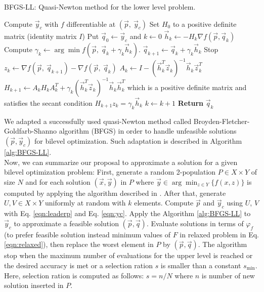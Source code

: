 \documentclass[conference]{IEEEtran}
\theoremstyle{definition}
\begin{document}
\begin{algorithm}[!ht]
    \caption{BFGS-LL: Quasi-Newton method for the lower level problem.}
    \label{alg:BFGS-LL}
    \begin{algorithmic}[1]
        \STATE Compute $\vec{y}_c$ with $f$ differentiable at $(\vec{p},\ \vec{y}_c)$
        \STATE Set $H_0$ to a positive definite matrix (identity matrix $I$)
        \STATE Put $\vec{q}_0 \gets \vec{y}_c$ and $k \gets 0$
            \STATE $\vec{h}_k \gets -H_k\nabla f(\vec{p}, \vec{q}_k)$
            \STATE Compute $\gamma_{k}\gets\arg \min f(\vec{p}, \ \vec{q} _{k}+ \gamma_k \vec{h} _{k})$.
            \STATE $\vec{q}_{k+1} \gets \vec{q}_k  + \gamma_k \vec{h}_k$
                \STATE Stop
            \ENDIF
            \STATE $z_k \gets \nabla f(\vec{p}, \ \vec{q}_{k+1}) - \nabla f(\vec{p}, \ \vec{q}_{k}) $
            \STATE $\displaystyle A_k \gets I - (\vec{h}_k^T \vec{z}_k)^{-1} \vec{h}_k \vec{z}_k^T$
            \STATE $H_{k+1} \gets A_k H_k A_k^T + \gamma_k(\vec{h}_k^T\vec{z}_k)^{-1}\vec{h}_k \vec{h}_k^T$
                   which is a positive definite matrix and satisfies the secant
                   condition $H_{k+1} z_k = \gamma_k \vec{h}_k$
            \STATE $k \gets k + 1$
        \ENDWHILE
        \STATE \textbf{Return} $\vec{q}_k$
    \end{algorithmic}
\end{algorithm}

We adapted a successfully used quasi-Newton method called Broyden-Fletcher-Goldfarb-Shanno
algorithm (BFGS) \cite{fletcher2013practical} in order to handle unfeasible
solutions $(\vec{p}, \vec{y}_c)$ for bilevel optimization. Such adaptation is
described in Algorithm \ref{alg:BFGS-LL}. \\
% 


Now, we can summarize our proposal to approximate a solution for a given bilevel
optimization problem: First, generate a random 2-population $P \in X \times Y$ of
size $N$ and for each solution $(\vec{x}, \vec{y})$ in $P$ where $\vec{y} \in \arg \min_{z\in Y} \{ f(x,z)\}$
is computed by applying the algorithm described in \cite{eca}. After that, generate
$U, V \in X\times Y$ uniformly at random with $k$ elements. Compute $\vec{p}$ and
$\vec{y}_c$ using $U$, $V$ with Eq. \ref{eqn:leaderp} and Eq. \ref{eqn:yc}. Apply
the Algorithm \ref{alg:BFGS-LL} to $\vec{y}_c$ to approximate a feasible solution
$(\vec{p}, \vec{q})$. Evaluate solutions in terms of $\varphi_f$ (to prefer feasible
solution instead minimum values of $F$ in relaxed problem in Eq. \ref{eqn:relaxed}),
then replace the worst element in $P$ by $(\vec{p}, \vec{q})$. The algorithm
stop when the maximum number of evaluations for the upper level is reached or the
desired accuracy is met or a selection ration $s$ is smaller than a constant $s_{\min}$.
Here, selection ration is computed as follows: $ s = n /N$ where $n$ is number of
new solution inserted  in $P$.
\end{document}
